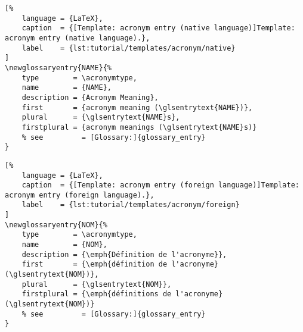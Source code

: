 

\begin{lstlisting}[%
    language = {LaTeX},
    caption  = {[Template: acronym entry (native language)]Template: acronym entry (native language).},
    label    = {lst:tutorial/templates/acronym/native}
]
\newglossaryentry{NAME}{%
    type        = \acronymtype,
    name        = {NAME},
    description = {Acronym Meaning},
    first       = {acronym meaning (\glsentrytext{NAME})},
    plural      = {\glsentrytext{NAME}s},
    firstplural = {acronym meanings (\glsentrytext{NAME}s)}
    % see         = [Glossary:]{glossary_entry}
}
\end{lstlisting}



\begin{lstlisting}[%
    language = {LaTeX},
    caption  = {[Template: acronym entry (foreign language)]Template: acronym entry (foreign language).},
    label    = {lst:tutorial/templates/acronym/foreign}
]
\newglossaryentry{NOM}{%
    type        = \acronymtype,
    name        = {NOM},
    description = {\emph{Définition de l'acronyme}},
    first       = {\emph{définition de l'acronyme} (\glsentrytext{NOM})},
    plural      = {\glsentrytext{NOM}},
    firstplural = {\emph{définitions de l'acronyme} (\glsentrytext{NOM})}
    % see         = [Glossary:]{glossary_entry}
}
\end{lstlisting}


